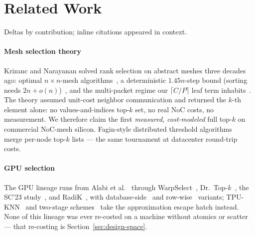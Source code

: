 
\section{Related Work}
\label{sec:related}

Deltas by contribution; inline citations appeared in context.

\paragraph{Mesh selection theory}
Krizanc and Narayanan solved rank selection on abstract meshes three
decades ago: optimal $n \times n$-mesh
algorithms~\cite{krizanc1992optimal}, a deterministic $1.45n$-step
bound (sorting needs $2n+o(n)$)~\cite{krizanc1993fast}, and the
multi-packet regime our $\lceil C/P\rceil$ leaf term
inhabits~\cite{multipacket1992}. The theory assumed unit-cost neighbor
communication and returned the $k$-th element alone: no
values-and-indices top-$k$ set, no real NoC costs, no measurement. We therefore claim the first \emph{measured,
cost-modeled} full top-$k$ on commercial NoC-mesh silicon.
Fagin-style distributed threshold
algorithms~\cite{fagin2003optimal,cao2004tput,michel2005klee} merge
per-node top-$k$ lists --- the same tournament at datacenter round-trip
costs.

\paragraph{GPU selection}
The GPU lineage runs from Alabi et al.~\cite{alabi2012kselection} through
WarpSelect~\cite{johnson2019billion}, Dr.~Top-$k$~\cite{gaihre2021drtopk},
the SC'23 study~\cite{zhang2023paralleltopk}, and
RadiK~\cite{li2024radik}, with database-side~\cite{shanbhag2018topk} and
row-wise~\cite{xie2024rtopk} variants; TPU-KNN~\cite{chern2022tpuknn} and
two-stage schemes~\cite{twostage2025} take the approximation escape hatch
instead. None of this lineage was ever re-costed on a machine without
atomics or scatter --- that re-costing is
Section~\ref{sec:design-space}.

